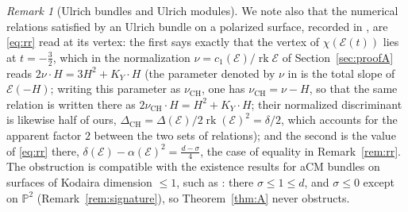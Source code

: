 \documentclass[11pt]{amsart}
\theoremstyle{remark}
\newtheorem{remark}[theorem]{Remark}
\theoremstyle{definition}
\newcommand{\PP}{\mathbb{P}}
\newcommand{\cE}{\mathcal{E}}
\newcommand{\rk}{\operatorname{rk}}
\begin{document}
\begin{remark}[Ulrich bundles and Ulrich modules]
We note also that the numerical relations satisfied by an Ulrich bundle on a polarized surface, recorded in \cite[Prop.~4.2]{CoHu}, are \eqref{eq:rr} read at its vertex: the first says exactly that the vertex of $\chi(\cE(t))$ lies at $t=-\tfrac32$, which in the normalization $\nu=c_1(\cE)/\rk\cE$ of Section~\ref{sec:proofA} reads $2\nu\cdot H=3H^2+K_Y\cdot H$ (the parameter denoted by $\nu$ in \cite[Prop.~4.2]{CoHu} is the total slope of $\cE(-H)$; writing this parameter as $\nu_{\mathrm{CH}}$, one has $\nu_{\mathrm{CH}}=\nu-H$, so that the same relation is written there as $2\nu_{\mathrm{CH}}\cdot H=H^2+K_Y\cdot H$; their normalized discriminant is likewise half of ours, $\Delta_{\mathrm{CH}}=\Delta(\cE)/2\rk(\cE)^2=\delta/2$, which accounts for the apparent factor $2$ between the two sets of relations); and the second is the value of \eqref{eq:rr} there, $\delta(\cE)-\alpha(\cE)^2=\tfrac{d-\sigma}4$, the case of equality in Remark~\ref{rem:rr}. The obstruction is compatible with the existence results for aCM bundles on surfaces of Kodaira dimension $\le1$, such as \cite{CH,Fa}: there $\sigma\le1\le d$, and $\sigma\le0$ except on $\PP^2$ (Remark~\ref{rem:signature}), so Theorem~\ref{thm:A} never obstructs.
\end{remark}
\end{document}
